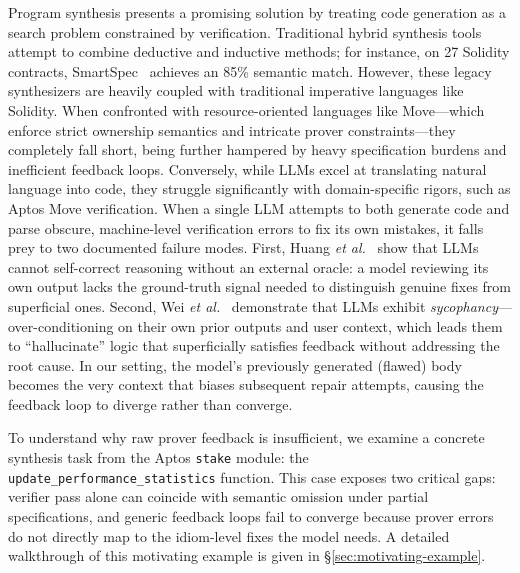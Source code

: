 Program synthesis presents a promising solution by treating code generation as a search problem constrained by verification. Traditional hybrid synthesis tools attempt to combine deductive and inductive methods; for instance, on 27 Solidity contracts, SmartSpec~\cite{smartspec} achieves an 85\% semantic match. However, these legacy synthesizers are heavily coupled with traditional imperative languages like Solidity. When confronted with resource-oriented languages like Move---which enforce strict ownership semantics and intricate prover constraints---they completely fall short, being further hampered by heavy specification burdens and inefficient feedback loops. Conversely, while LLMs excel at translating natural language into code, they struggle significantly with domain-specific rigors, such as Aptos Move verification. When a single LLM attempts to both generate code and parse obscure, machine-level verification errors to fix its own mistakes, it falls prey to two documented failure modes. First, Huang \emph{et al.}~\cite{huang2024llmselfcorrect} show that LLMs cannot self-correct reasoning without an external oracle: a model reviewing its own output lacks the ground-truth signal needed to distinguish genuine fixes from superficial ones. Second, Wei \emph{et al.}~\cite{wei2024sycophancy,wei2023syntheticsycophancy} demonstrate that LLMs exhibit \emph{sycophancy}---over-conditioning on their own prior outputs and user context, which leads them to ``hallucinate'' logic that superficially satisfies feedback without addressing the root cause. In our setting, the model's previously generated (flawed) body becomes the very context that biases subsequent repair attempts, causing the feedback loop to diverge rather than converge.

To understand why raw prover feedback is insufficient, we examine a concrete synthesis task from the Aptos \texttt{stake} module: the \texttt{update\_performance\_statistics} function. This case exposes two critical gaps: verifier pass alone can coincide with semantic omission under partial specifications, and generic feedback loops fail to converge because prover errors do not directly map to the idiom-level fixes the model needs. A detailed walkthrough of this motivating example is given in \S\ref{sec:motivating-example}.

